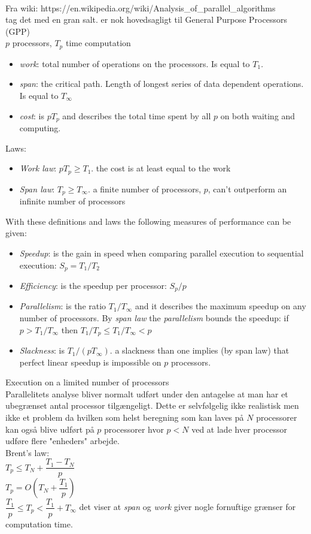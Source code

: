 ~\\
Fra wiki: https://en.wikipedia.org/wiki/Analysis\_of\_parallel\_algorithms\\
tag det med en gran salt. er nok hovedsagligt til General Purpose Processors (GPP)\\
$p$ processors, $T_p$ time computation
\begin{itemize}
 \item \textit{work}: total number of operations on the processors. Is equal to $T_1$.
 \item \textit{span}: the critical path. Length of longest series of data dependent operations. Is equal to $T_\infty$
 \item \textit{cost}: is $pT_p$ and describes the total time spent by all $p$ on both waiting and computing.
\end{itemize}
Laws:
\begin{itemize}
  \item \textit{Work law}: $pT_p \geq T_1$. the cost is at least equal to the work
  \item \textit{Span law}: $T_p \geq T_\infty$. a finite number of processors, $p$, can't outperform an infinite number of processors
\end{itemize}
With these definitions and laws the following measures of performance can be given:
\begin{itemize}
  \item \textit{Speedup}: is the gain in speed when comparing parallel execution to sequential execution: $S_p = T_1 / T_2$
  \item \textit{Efficiency}: is the speedup per processor: $S_p / p$
  \item \textit{Parallelism}: is the ratio $T_1 / T_\infty$ and it describes the maximum speedup on any number of processors. By \textit{span law} the \textit{parallelism} bounds the speedup: if $p>T_1/ T_\infty$ then $T_1/T_p \leq T_1 / T_\infty < p$ 
  \item \textit{Slackness}: is $T_1/(pT_\infty)$. a slackness than one implies (by span law) that perfect linear speedup is impossible on $p$ processors.
\end{itemize}
Execution on a limited number of processors\\
Parallelitets analyse bliver normalt udført under den antagelse at man har et ubegrænset antal processor tilgængeligt. Dette er selvfølgelig ikke realistisk men ikke et problem da hvilken som helst beregning som kan laves på $N$ processorer kan også blive udført på $p$ processorer hvor $p < N$ ved at lade hver processor udføre flere "enheders" arbejde. \\
Brent's law:\\
$T_p \leq T_N + \dfrac{T_1 - T_N}{p}$ \\
$T_p = O \left( T_N + \dfrac{T_1}{p} \right)$\\
$\dfrac{T_1}{p} \leq T_p < \dfrac{T_1}{p} + T_\infty$ det viser at \textit{span} og \textit{work} giver nogle fornuftige grænser for computation time.\\
\color{black}

